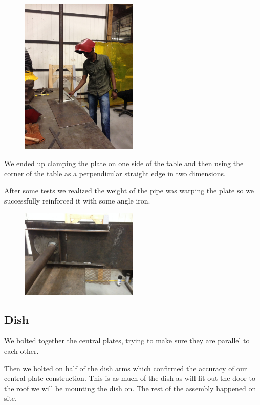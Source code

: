 \documentclass[11pt]{article} %
\begin{document}
\begin{figure}
  \centering
  \caption{   }
  \includegraphics[width=0.50\textwidth]{roofmount/05.jpeg}
\end{figure}


We ended up clamping the plate on one side of the table and then using the corner of the table as a perpendicular straight edge in two dimensions.

After some tests we realized the weight of the pipe was warping the plate so we successfully reinforced it with some angle iron.

\begin{figure}
  \centering
  \caption{   }
  \includegraphics[width=0.50\textwidth]{roofmount/06.jpeg}
\end{figure}

\subsection{Dish}

We bolted together the central plates, trying to make sure they are parallel to each other.

Then we bolted on half of the dish arms which confirmed the accuracy of our central plate construction. This is as much of the dish as will fit out the door to the roof we will be mounting the dish on. The rest of the assembly happened on site.
\end{document}

